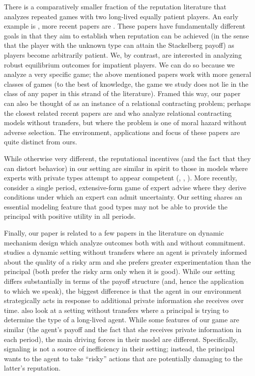 \documentclass[11pt,reqno]{amsart}
\begin{document}
There is a comparatively smaller fraction of the reputation literature that analyzes repeated games with two long-lived equally patient players. An early example is \cite{cripps1997}, more recent papers are \cite{atakan2012,atakan2013}. These papers have fundamentally different goals in that they aim to establish when reputation can be achieved (in the sense that the player with the unknown type can attain the Stackelberg payoff) as players become arbitrarily patient. We, by contrast, are interested in analyzing robust equilibrium outcomes for impatient players. We can do so because we analyze a very specific game; the above mentioned papers work with more general classes of games (to the best of knowledge, the game we study does not lie in the class of any paper in this strand of the literature). Framed this way, our paper can also be thought of as an instance of a relational contracting problem; perhaps the closest related recent papers are \cite{li2017} and \cite{mitchell2017} who analyze relational contracting models without transfers, but where the problem is one of moral hazard without adverse selection. The environment, applications and focus of these papers are quite distinct from ours.

While otherwise very different, the reputational incentives (and the fact that they can distort behavior) in our setting are similar in spirit to those in models where experts with private types attempt to appear competent (\cite{prendergast1996}, \cite{morris2001}, \cite{ottaviani2006reputational}). More recently, \citet{backus2018} consider a single period, extensive-form game of expert advise where they derive conditions under which an expert can admit uncertainty. Our setting shares an essential modeling feature that good types may not be able to provide the principal with positive utility in all periods.

Finally, our paper is related to a few papers in the literature on dynamic mechanism design which analyze outcomes both with and without commitment. \cite{guo2016} studies a dynamic setting without transfers where an agent is privately informed about the quality of a risky arm and she prefers greater experimentation than the principal (both prefer the risky arm only when it is good). While our setting differs substantially in terms of the payoff structure (and, hence the application to which we speak), the biggest difference is that the agent in our environment strategically acts in response to additional private information she receives over time. \cite{aghion2016} also look at a setting without transfers where a principal is trying to determine the type of a long-lived agent. While some features of our game are similar (the agent's payoff and the fact that she receives private information in each period), the main driving forces in their model are different. Specifically, signaling is not a source  of inefficiency in their setting; instead, the principal wants to the agent to take ``risky'' actions that are potentially damaging to the latter's reputation.

\newpage



\end{document}
